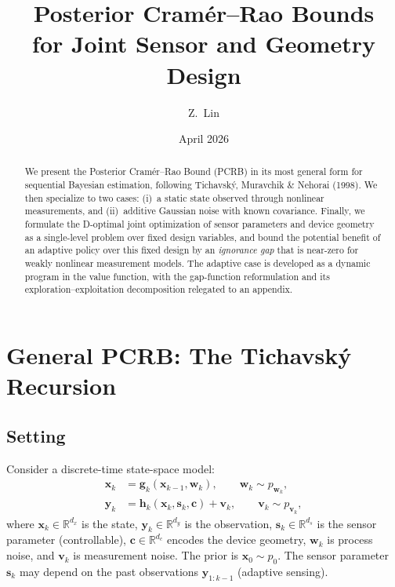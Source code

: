 \documentclass[11pt,a4paper]{article}
\title{Posterior Cram\'er--Rao Bounds\\for Joint Sensor and Geometry Design}
\author{Z.\ Lin}
\date{April 2026}
\newcommand{\R}{\mathbb{R}}
\begin{document}
\maketitle

\begin{abstract}
We present the Posterior Cram\'er--Rao Bound (PCRB) in its most general form for sequential Bayesian estimation, following Tichavsk\'y, Muravchik \& Nehorai (1998).  We then specialize to two cases: (i)~a static state observed through nonlinear measurements, and (ii)~additive Gaussian noise with known covariance.  Finally, we formulate the D-optimal joint optimization of sensor parameters and device geometry as a single-level problem over fixed design variables, and bound the potential benefit of an adaptive policy over this fixed design by an \emph{ignorance gap} that is near-zero for weakly nonlinear measurement models.  The adaptive case is developed as a dynamic program in the value function, with the gap-function reformulation and its exploration--exploitation decomposition relegated to an appendix.
\end{abstract}

\tableofcontents

\section{General PCRB: The Tichavsk\'y Recursion}

\subsection{Setting}

Consider a discrete-time state-space model:
\begin{align}
  \bm{x}_k &= \bm{g}_k(\bm{x}_{k-1}, \bm{w}_k), \qquad \bm{w}_k \sim p_{\bm{w}_k}, \label{eq:state} \\
  \bm{y}_k &= \bm{h}_k(\bm{x}_k, \bm{s}_k, \bm{c}) + \bm{v}_k, \qquad \bm{v}_k \sim p_{\bm{v}_k}, \label{eq:obs}
\end{align}
where $\bm{x}_k \in \R^{d_x}$ is the state, $\bm{y}_k \in \R^{d_y}$ is the observation, $\bm{s}_k \in \R^{d_s}$ is the sensor parameter (controllable), $\bm{c} \in \R^{d_c}$ encodes the device geometry, $\bm{w}_k$ is process noise, and $\bm{v}_k$ is measurement noise.  The prior is $\bm{x}_0 \sim p_0$.  The sensor parameter $\bm{s}_k$ may depend on the past observations $\bm{y}_{1:k-1}$ (adaptive sensing).
\end{document}

